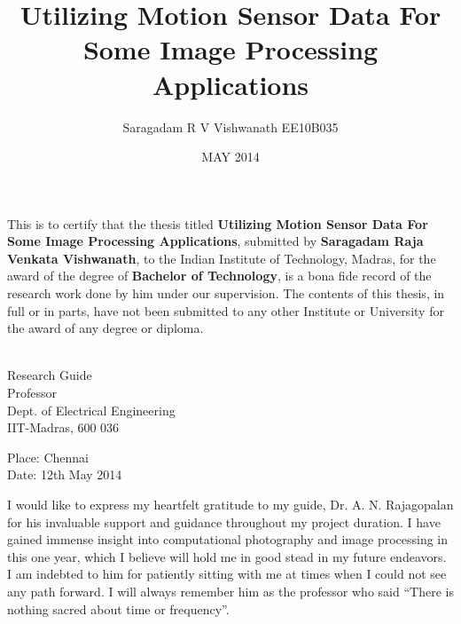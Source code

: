 \documentclass[BTech]{iitmdiss}
\begin{document}
\title{Utilizing Motion Sensor Data For Some Image Processing Applications}
\author{\hspace{35pt} Saragadam R V Vishwanath \newline EE10B035}
\date{MAY 2014}
\maketitle
\pagebreak

\certificate

\vspace*{0.5in}

\noindent This is to certify that the thesis titled {\bf Utilizing Motion
Sensor Data For Some Image Processing Applications}, submitted by
  {\bf Saragadam Raja Venkata Vishwanath}, 
  to the Indian Institute of Technology, Madras, for
the award of the degree of {\bf Bachelor of Technology}, is a bona fide
record of the research work done by him under our supervision.  The
contents of this thesis, in full or in parts, have not been submitted
to any other Institute or University for the award of any degree or
diploma.

\vspace*{1.5in}

\begin{singlespacing}
\hspace*{-0.25in}
\parbox{2.5in}{
 \\
\noindent Research Guide \\ 
\noindent Professor \\
\noindent Dept. of Electrical Engineering\\
\noindent IIT-Madras, 600 036 \\
} 
\hspace*{1.0in} 
\end{singlespacing}
\vspace*{0.25in}
\noindent Place: Chennai\\
Date: 12th May 2014

\pagebreak

\acknowledgements

I would like to express my heartfelt gratitude to my guide, 
Dr. A. N. Rajagopalan for his invaluable support and guidance throughout
my project duration. I have gained immense insight into computational
photography and image processing in this one year, which I believe will 
hold me in good stead in my future endeavors. I am indebted to him for
patiently sitting with me at times when I could not see any path forward. 
I will always remember him as the professor who said ``There is nothing
sacred about time or frequency''.
\end{document}
